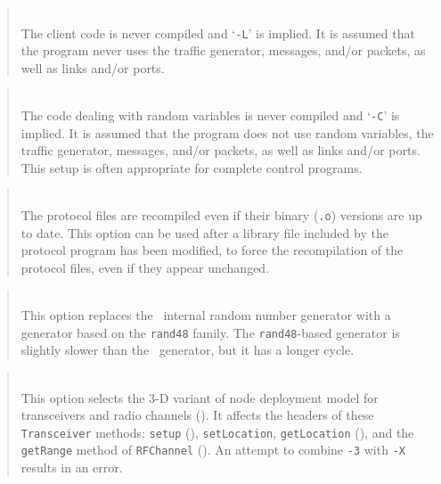 \begin{quote}
\noindent{}\\ \hspace{0in}
The client code is never compiled and `{\tt -L}' is implied.
It is assumed that the program never uses
the traffic generator, messages, and/or packets, as well as links and/or
ports.
\end{quote}

\begin{quote}
\noindent{}\\ \hspace{0in}
The code dealing with random variables is never compiled and
`{\tt -C}' is implied.
It is assumed that the program does not use random variables,
the traffic generator, messages, and/or packets, as well as links and/or
ports.
This setup is often appropriate for complete control programs.
\end{quote}

\begin{quote}
\noindent{}\\ \hspace{0in}
The protocol files are recompiled even if their binary ({\tt .o}) versions
are up to date.
This option can be used after a library file included by the protocol
program has been modified, to force the recompilation of the protocol
files, even if they appear unchanged.
\end{quote}

\begin{quote}
\noindent{}\\ \hspace{0in}
This option replaces the \smurph\ internal random number generator with
a generator based on the {\tt rand48} family.
The {\tt rand48}-based generator is slightly slower than the \smurph\ generator,
but it has a longer cycle.
\end{quote}

\begin{quote}
\noindent{}\\ \hspace{0in}
This option selects the 3-D variant of node deployment model for transceivers
and radio channels ().
It affects the headers of these {\tt Transceiver} methods:
{\tt setup} (), {\tt setLocation}, {\tt getLocation}
(), and the {\tt getRange} method of {\tt RFChannel}
().
An attempt to combine {\tt -3} with {\tt -X} results in an error.
\end{quote}

